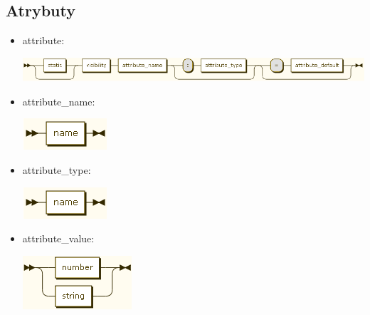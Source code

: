 \subsection{Atrybuty}
\begin{itemize}
\item attribute:

\includegraphics[scale=0.66]{images/grammar/attribute.png}

\item attribute\_name:

\includegraphics[scale=0.66]{images/grammar/name_xx.png}

\item attribute\_type:

\includegraphics[scale=0.66]{images/grammar/name_xx.png}

\item attribute\_value:

\includegraphics[scale=0.66]{images/grammar/attribute_value.png}
\end{itemize}

